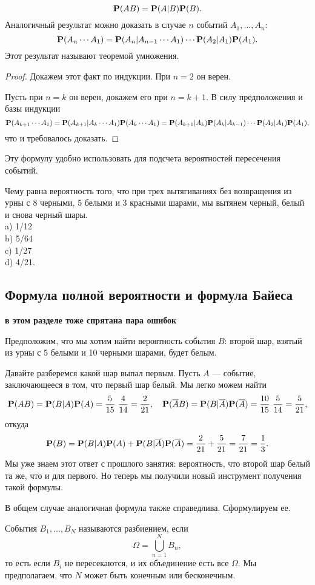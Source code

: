 \documentclass[11 pt,russian]{article}
\begin{document}
$$
{\bf P}(AB) = {\bf P}(A|B) {\bf P}(B).
$$
Аналогичный результат можно доказать в случае $n$ событий $A_1,\dotsc,A_n$:
$$
{\bf P}(A_n \dotsm A_1) = {\bf P}(A_n|A_{n-1}\dotsm A_1) \dotsm {\bf P}(A_2|A_1) {\bf P}(A_1).
$$
Этот результат называют теоремой умножения.
\begin{proof}
Докажем этот факт по индукции. При $n=2$ он верен. 

Пусть при $n=k$ он верен, докажем его при $n=k+1$. В силу предположения и базы индукции
$$
{\bf P}(A_{k+1}\dotsm A_1) = {\bf P}(A_{k+1}|A_k \dotsm A_1) {\bf P}(A_k \dotsm A_1) = {\bf P}(A_{k+1}|A_k) {\bf P}(A_k|A_{k-1}) \dotsm {\bf P}(A_2|A_1) {\bf P}(A_1),
$$
что и требовалось доказать.
\end{proof}
Эту формулу удобно использовать для подсчета вероятностей пересечения событий.
\begin{Que}
Чему равна вероятность того, что при трех вытягиваниях без возвращения из урны с 8 черными, 5 белыми и 3 красными шарами, мы вытянем черный, белый и снова черный шары.\\
a) 1/12\\
b) 5/64\\
c) 1/27\\
d) 4/21.
\end{Que}
\subsection{Формула полной вероятности и формула Байеса}
{\bf в этом разделе тоже спрятана пара ошибок}
\begin{Exam}
Предположим, что мы хотим найти вероятность события $B$: второй шар, взятый из урны с 5 белыми и 10 черными шарами, будет белым. 

Давайте разберемся какой шар выпал первым. Пусть $A$ --- событие, заключающееся в том, что первый шар белый. Мы легко можем найти
$$
{\bf P}(A B) = {\bf P}(B|A) {\bf P}(A) = \frac{5}{15}\ \frac{4}{14} = \frac{2}{21},\quad {\bf P}(\overline{A} B) = {\bf P}(B|\overline{A}) {\bf P}(\overline{A}) = \frac{10}{15}\ \frac{5}{14} = \frac{5}{21},
$$
откуда 
$$
{\bf P}(B) = {\bf P}(B|A) {\bf P}(A) + {\bf P}(B|\overline{A}) {\bf P}(\overline{A}) = \frac{2}{21} + \frac{5}{21} = \frac{7}{21}=\frac13.
$$
Мы уже знаем этот ответ с прошлого занятия: вероятность, что второй шар белый та же, что и для первого. Но теперь мы получили новый инструмент получения такой формулы.
\end{Exam}
В общем случае аналогичная формула также справедлива. Сформулируем ее.
\begin{Def}
События $B_1,\dotsc,B_N$ называются разбиением, если 
$$\Omega = \bigcup_{n=1}^{N} B_n,$$
то есть если $B_i$ не пересекаются, и их объединение есть все $\Omega$. Мы предполагаем, что $N$ может быть конечным или бесконечным.
\end{Def}
\end{document}
